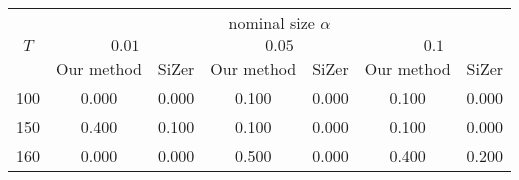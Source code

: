 \documentclass[a4paper,12pt]{article}
\begin{document}
% 
\begin{tabular}{|c|cc|cc|cc|}
  \hline
  & \multicolumn{6}{|c|}{nominal size $\alpha$} \\
 \cline{2-7}
 $T$ & \multicolumn{2}{|c|}{$0.01$} & \multicolumn{2}{|c|}{$0.05$} & \multicolumn{2}{|c|}{$0.1$} \\
  & Our method & SiZer & Our method & SiZer & Our method & SiZer \\
 \hline
100 & 0.000 & 0.000 & 0.100 & 0.000 & 0.100 & 0.000 \\ 
  150 & 0.400 & 0.100 & 0.100 & 0.000 & 0.100 & 0.000 \\ 
  160 & 0.000 & 0.000 & 0.500 & 0.000 & 0.400 & 0.200 \\ 
   \hline
\end{tabular}
\end{document}
